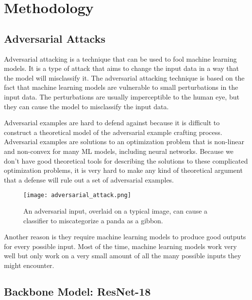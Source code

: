 \section{Methodology}

\subsection{Adversarial Attacks}


Adversarial attacking is a technique that can be used to fool machine learning models. It is a type of attack that aims to change the input data in a way that the model will misclassify it. The adversarial attacking technique is based on the fact that machine learning models are vulnerable to small perturbations in the input data. The perturbations are usually imperceptible to the human eye, but they can cause the model to misclassify the input data.

Adversarial examples are hard to defend against because it is difficult to construct a theoretical model of the adversarial example crafting process. Adversarial examples are solutions to an optimization problem that is non-linear and non-convex for many ML models, including neural networks. Because we don't have good theoretical tools for describing the solutions to these complicated optimization problems, it is very hard to make any kind of theoretical argument that a defense will rule out a set of adversarial examples.

\begin{figure}[h]
    \centering
    \texttt{[image: adversarial\_attack.png]}
    \caption{An adversarial input, overlaid on a typical image, can cause a classifier to miscategorize a panda as a gibbon.}
    \label{fig:adversarial_attack}
\end{figure}
    

Another reason is they require machine learning models to produce good outputs for every possible input. Most of the time, machine learning models work very well but only work on a very small amount of all the many possible inputs they might encounter. \cite{adversarial_2020}


\subsection{Backbone Model: ResNet-18}



